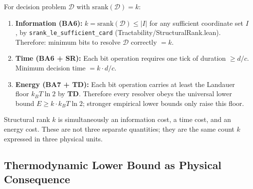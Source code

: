 \begin{theorem}[Structural Rank = Minimum Bit Operations]\label{thm:srank-physical}
For decision problem $\mathcal{D}$ with $\mathrm{srank}(\mathcal{D}) = k$:

\begin{enumerate}
\item \textbf{Information (BA6):}
  $k = \mathrm{srank}(\mathcal{D}) \leq |I|$ for any sufficient coordinate set $I$,
  by \texttt{srank\_le\_sufficient\_card} (Tractability/StructuralRank.lean).
  Therefore: minimum bits to resolve $\mathcal{D}$ correctly $= k$.

\item \textbf{Time (BA6 + SR):}
  Each bit operation requires one tick of duration $\geq d/c$.
  Minimum decision time $= k \cdot d/c$.

\item \textbf{Energy (BA7 + TD):}
  Each bit operation carries at least the Landauer floor $k_B T \ln 2$ by \textbf{TD}.
  Therefore every resolver obeys the universal lower bound $E \geq k \cdot k_B T \ln 2$; stronger empirical lower bounds only raise this floor.
\end{enumerate}

Structural rank $k$ is simultaneously an information cost, a time cost,
and an energy cost. These are not three separate quantities; they are the
same count $k$ expressed in three physical units.
\end{theorem}

\subsection{Thermodynamic Lower Bound as Physical Consequence}\label{sec:thermo-derived}

